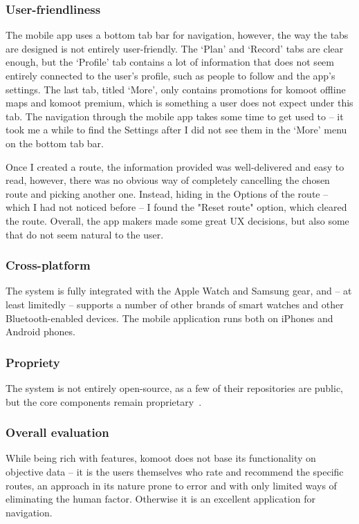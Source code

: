 \subsubsection*{User-friendliness}
The mobile app uses a bottom tab bar for navigation, however, the way the tabs are designed is not entirely user-friendly.
The `Plan' and `Record' tabs are clear enough, but the `Profile' tab contains a lot of information that does not seem entirely connected to the user's profile, such as people to follow and the app's settings.
The last tab, titled `More', only contains promotions for komoot offline maps and komoot premium, which is something a user does not expect under this tab.
The navigation through the mobile app takes some time to get used to -- it took me a while to find the Settings after I did not see them in the `More' menu on the bottom tab bar.

Once I created a route, the information provided was well-delivered and easy to read, however, there was no obvious way of completely cancelling the chosen route and picking another one.
Instead, hiding in the Options of the route -- which I had not noticed before -- I found the "Reset route" option, which cleared the route.
Overall, the app makers made some great UX decisions, but also some that do not seem natural to the user.
\subsubsection*{Cross-platform}
The system is fully integrated with the Apple Watch and Samsung gear, and -- at least limitedly -- supports a number of other brands of smart watches and other Bluetooth-enabled devices.
The mobile application runs both on iPhones and Android phones.
\subsubsection*{Propriety}
The system is not entirely open-source, as a few of their repositories are public, but the core components remain proprietary~\cite{komoot-github}.

\subsubsection*{Overall evaluation}
While being rich with features, komoot does not base its functionality on objective data -- it is the users themselves who rate and recommend the specific routes,
an approach in its nature prone to error and with only limited ways of eliminating the human factor.
Otherwise it is an excellent application for navigation.


